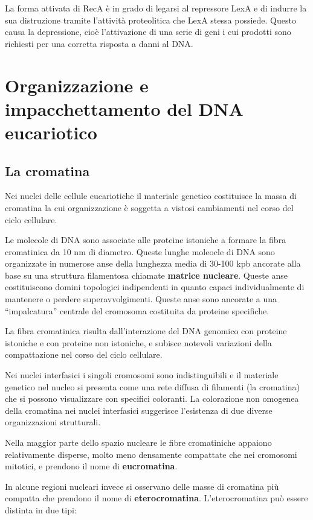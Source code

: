 \documentclass[11pt]{book}
\begin{document}
La forma attivata di RecA è in grado di legarsi al repressore LexA e di
indurre la sua distruzione tramite l'attività proteolitica che LexA
stessa possiede. Questo causa la depressione, cioè l'attivazione di una
serie di geni i cui prodotti sono richiesti per una corretta risposta a
danni al DNA.

\chapter{Organizzazione e impacchettamento del DNA
eucariotico}\label{organizzazione-e-impacchettamento-del-dna-eucariotico}

\section{La cromatina}\label{la-cromatina}

Nei nuclei delle cellule eucariotiche il materiale genetico costituisce
la massa di cromatina la cui organizzazione è soggetta a vistosi
cambiamenti nel corso del ciclo cellulare.

Le molecole di DNA sono associate alle proteine istoniche a formare la
fibra cromatinica da 10 nm di diametro. Queste lunghe moleocle di DNA
sono organizzate in numerose anse della lunghezza media di 30-100 kpb
ancorate alla base su una struttura filamentosa chiamate \textbf{matrice
nucleare}. Queste anse costituiscono domini topologici indipendenti in
quanto capaci individualmente di mantenere o perdere superavvolgimenti.
Queste anse sono ancorate a una ``impalcatura'' centrale del cromosoma
costituita da proteine specifiche.

La fibra cromatinica risulta dall'interazione del DNA genomico con
proteine istoniche e con proteine non istoniche, e subisce notevoli
variazioni della compattazione nel corso del ciclo cellulare.

Nei nuclei interfasici i singoli cromosomi sono indistinguibili e il
materiale genetico nel nucleo si presenta come una rete diffusa di
filamenti (la cromatina) che si possono visualizzare con specifici
coloranti. La colorazione non omogenea della cromatina nei nuclei
interfasici suggerisce l'esistenza di due diverse organizzazioni
strutturali.

Nella maggior parte dello spazio nucleare le fibre cromatiniche appaiono
relativamente disperse, molto meno densamente compattate che nei
cromosomi mitotici, e prendono il nome di \textbf{eucromatina}.

In alcune regioni nucleari invece si osservano delle masse di cromatina
più compatta che prendono il nome di \textbf{eterocromatina}.
L'eterocromatina può essere distinta in due tipi:
\end{document}
